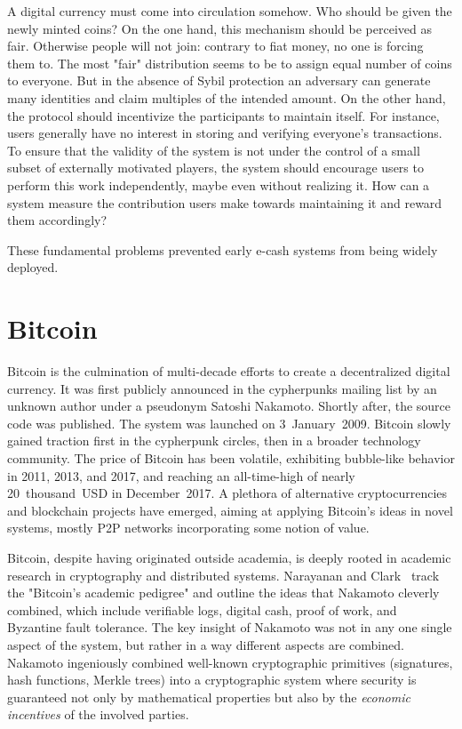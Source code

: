 A digital currency must come into circulation somehow.
Who should be given the newly minted coins?
On the one hand, this mechanism should be perceived as fair.
Otherwise people will not join: contrary to fiat money, no one is forcing them to.
The most "fair" distribution seems to be to assign equal number of coins to everyone.
But in the absence of Sybil protection an adversary can generate many identities and claim multiples of the intended amount.
On the other hand, the protocol should incentivize the participants to maintain itself.
For instance, users generally have no interest in storing and verifying everyone's transactions.
To ensure that the validity of the system is not under the control of a small subset of externally motivated players, the system should encourage users to perform this work independently, maybe even without realizing it.
How can a system measure the contribution users make towards maintaining it and reward them accordingly?

These fundamental problems prevented early e-cash systems from being widely deployed.


\section{Bitcoin}

Bitcoin is the culmination of multi-decade efforts to create a decentralized digital currency.
It was first publicly announced in the cypherpunks mailing list by an unknown author under a pseudonym Satoshi Nakamoto.
Shortly after, the source code was published.
The system was launched on 3~January~2009.
Bitcoin slowly gained traction first in the cypherpunk circles, then in a broader technology community.
The price of Bitcoin has been volatile, exhibiting bubble-like behavior in 2011, 2013, and 2017, and reaching an all-time-high of nearly 20~thousand~USD in December~2017.
A plethora of alternative cryptocurrencies and blockchain projects have emerged, aiming at applying Bitcoin's ideas in novel systems, mostly P2P networks incorporating some notion of value.

Bitcoin, despite having originated outside academia, is deeply rooted in academic research in cryptography and distributed systems.
Narayanan and Clark~\cite{Narayanan2017} track the "Bitcoin's academic pedigree" and outline the ideas that Nakamoto cleverly combined, which include verifiable logs, digital cash, proof of work, and Byzantine fault tolerance.
The key insight of Nakamoto was not in any one single aspect of the system, but rather in a way different aspects are combined.
Nakamoto ingeniously combined well-known cryptographic primitives (signatures, hash functions, Merkle trees) into a cryptographic system where security is guaranteed not only by mathematical properties but also by the \textit{economic incentives} of the involved parties.

